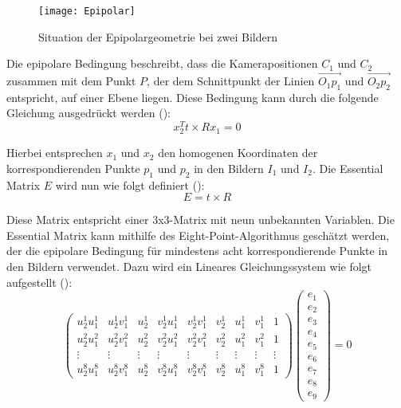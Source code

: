 \begin{figure}
    \centering
    \texttt{[image: Epipolar]}
    \caption{Situation der Epipolargeometrie bei zwei Bildern\label{fig:Epipolar}}\par
\end{figure}

Die epipolare Bedingung beschreibt, dass die Kamerapositionen \( C_1 \) und \( C_2 \) zusammen mit dem Punkt \( P \), der dem Schnittpunkt der Linien \( \overrightarrow{O_1p_1} \) und \( \overrightarrow{O_2p_2} \) entspricht, auf einer Ebene liegen. Diese Bedingung kann durch die folgende Gleichung ausgedrückt werden (\cite{gao2021vSLAM}):
\begin{equation}
    x_2^T t \times R x_1 = 0
\end{equation}

Hierbei entsprechen \( x_1 \) und \( x_2 \) den homogenen Koordinaten der korrespondierenden Punkte \( p_1 \) und \( p_2 \) in den Bildern \( I_1 \) und \( I_2 \). Die Essential Matrix \( E \) wird nun wie folgt definiert (\cite{gao2021vSLAM}):
\begin{equation}
    E = t \times R
\end{equation}

Diese Matrix entspricht einer 3x3-Matrix mit neun unbekannten Variablen. Die Essential Matrix kann mithilfe des Eight-Point-Algorithmus geschätzt werden, der die epipolare Bedingung für mindestens acht korrespondierende Punkte in den Bildern verwendet. Dazu wird ein Lineares Gleichungssystem wie folgt aufgestellt (\cite{gao2021vSLAM, stachniss2020FandEmatrix}): 
\begin{equation}
    \begin{pmatrix}
        u_2^1 u_1^1 & u_2^1 v_1^1 & u_2^1 & v_2^1 u_1^1 & v_2^1 v_1^1 & v_2^1 & u_1^1 & v_1^1 & 1 \\
        u_2^2 u_1^2 & u_2^2 v_1^2 & u_2^2 & v_2^2 u_1^2 & v_2^2 v_1^2 & v_2^2 & u_1^2 & v_1^2 & 1 \\
        \vdots & \vdots & \vdots & \vdots & \vdots & \vdots & \vdots & \vdots & \vdots \\
        u_2^8 u_1^8 & u_2^8 v_1^8 & u_2^8 & v_2^8 u_1^8 & v_2^8 v_1^8 & v_2^8 & u_1^8 & v_1^8 & 1 
    \end{pmatrix}
    \begin{pmatrix}
        e_1 \\ e_2 \\ e_3 \\ e_4 \\ e_5 \\ e_6 \\ e_7 \\ e_8 \\ e_9
    \end{pmatrix}
    = 0
\end{equation}

